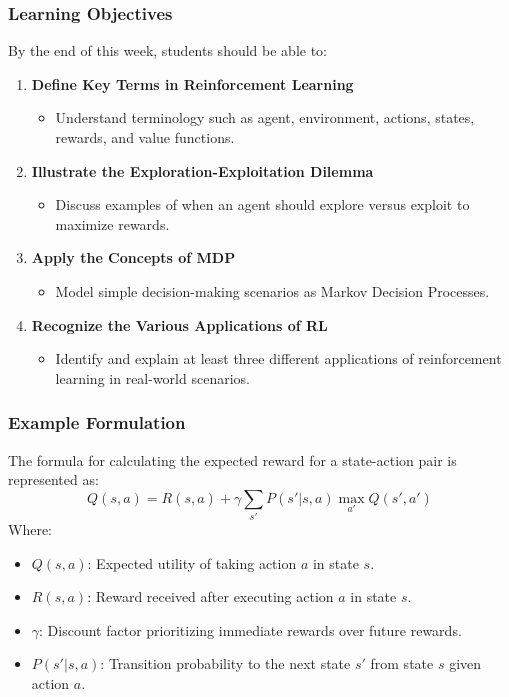 \documentclass{beamer}
\begin{document}
\begin{frame}[fragile]
    \frametitle{Learning Objectives}
    By the end of this week, students should be able to:
    \begin{enumerate}
        \item \textbf{Define Key Terms in Reinforcement Learning}
            \begin{itemize}
                \item Understand terminology such as agent, environment, actions, states, rewards, and value functions.
            \end{itemize}
        \item \textbf{Illustrate the Exploration-Exploitation Dilemma}
            \begin{itemize}
                \item Discuss examples of when an agent should explore versus exploit to maximize rewards.
            \end{itemize}
        \item \textbf{Apply the Concepts of MDP}
            \begin{itemize}
                \item Model simple decision-making scenarios as Markov Decision Processes.
            \end{itemize}
        \item \textbf{Recognize the Various Applications of RL}
            \begin{itemize}
                \item Identify and explain at least three different applications of reinforcement learning in real-world scenarios.
            \end{itemize}
    \end{enumerate}
\end{frame}

\begin{frame}[fragile]
    \frametitle{Example Formulation}
    The formula for calculating the expected reward for a state-action pair is represented as:
    \begin{equation}
        Q(s, a) = R(s, a) + \gamma \sum_{s'} P(s'|s, a) \max_{a'} Q(s', a')
    \end{equation}
    Where:
    \begin{itemize}
        \item $Q(s, a)$: Expected utility of taking action $a$ in state $s$.
        \item $R(s, a)$: Reward received after executing action $a$ in state $s$.
        \item $\gamma$: Discount factor prioritizing immediate rewards over future rewards.
        \item $P(s'|s, a)$: Transition probability to the next state $s'$ from state $s$ given action $a$.
    \end{itemize}
\end{frame}
\end{document}
